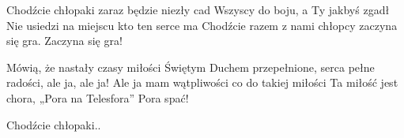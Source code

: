\documentclass[../../../songbook.tex]{subfiles}
\begin{document}
\-\hspace{1cm} Chodźcie chłopaki zaraz będzie niezły cad \newline
\-\hspace{1cm} Wszyscy do boju, a Ty jakbyś zgadł \newline
\-\hspace{1cm} Nie usiedzi na miejscu kto ten serce ma \newline
\-\hspace{1cm} Chodźcie razem z nami chłopcy zaczyna się gra. Zaczyna się gra! \newline

Mówią, że nastały czasy miłości \newline
Świętym Duchem przepełnione, serca pełne radości, ale ja, ale ja! \newline
Ale ja mam wątpliwości co do takiej miłości \newline
Ta miłość jest chora, „Pora na Telesfora” Pora spać! \newline

\-\hspace{1cm} Chodźcie chłopaki..
\end{document}
